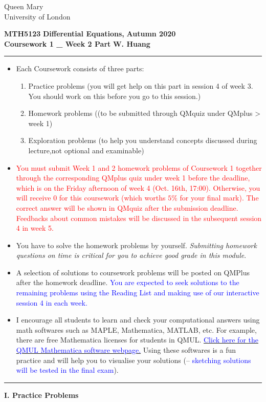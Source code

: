 \documentclass[11pt,a4paper,twoside]{article}
\begin{document}
	\begin{singlespace}
		\begin{center}
			\Huge Queen Mary\\
			\LARGE University of London
		\end{center}
		\Large \textbf{MTH5123} \hfill \Large \textbf{Differential Equations,} \hfill \Large \textbf{Autumn 2020}\\
		\large \textbf{Coursework 1 \_ Week 2 Part} \hfill \large \textbf{W. Huang}
	\end{singlespace}
	\rule{\textwidth}{0.4pt}
	\begin{itemize}
		\item Each Coursework consists of three parts:
		\begin{enumerate}[\bfseries I.]
			\item Practice problems (you will get help on this part in session 4 of week 3. You should work on this before you go to this session.)
			\item Homework problems ((to be submitted through QMquiz under QMplus > week 1)
			\item Exploration problems (to help you understand concepts discussed during lecture,not optional and examinable)
		\end{enumerate}
		\item \textcolor{red}{You must submit Week 1 and 2 homework problems of Coursework 1 together through the corresponding QMplus quiz under week 1 before the deadline, which is on the Friday afternoon of week 4 (Oct. 16th, 17:00). Otherwise, you will receive 0 for this coursework (which worths $5\%$ for your final mark). The correct answer will be shown in QMquiz after the submission deadline. Feedbacks about common mistakes will be discussed in the subsequent session 4 in week 5.}
		\item You have to solve the homework problems by yourself. \textit{Submitting homework questions on time is critical for you to achieve good grade in this module}.
		\item A selection of solutions to coursework problems will be posted on QMPlus after the homework deadline. \textcolor{blue}{You are expected to seek solutions to the remaining problems using the Reading List and making use of our interactive session 4 in each week.}
		\item I encourage all students to learn and check your computational answers using math softwares such as MAPLE, Mathematica, MATLAB, etc. For example, there are free Mathematica licenses for students in QMUL. \href{https://www.its.qmul.ac.uk/services/service-catalogue/items/software---computational-mathematica.html}{\textcolor{blue}{Click here for the QMUL Mathematica software webpage.}} Using these softwares is a fun practice and will help you to visualise your solutions (– \textcolor{blue}{sketching solutions will be tested in the final exam}).
	\end{itemize}
	\rule{\textwidth}{0.4pt}
	\newpage
	\textbf{I. Practice Problems}\par
\end{document}
